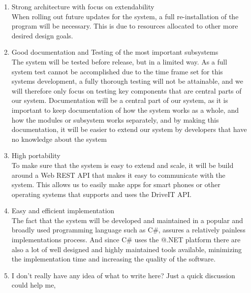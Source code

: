 \begin{enumerate}
\item Strong architecture with focus on extendability\\
When rolling out future updates for the system, a full re-installation of the program will be necessary. This is due to resources allocated to other more desired design goals.\\

\item Good documentation and Testing of the most important subsystems\\
The system will be tested before release, but in a limited way. As a full system test cannot be accomplished due to the time frame set for this systems development, a fully thorough testing will not be attainable, and we will therefore only focus on testing key components that are central parts of our system.
Documentation will be a central part of our system, as it is important to keep documentation of how the system works as a whole, and how the modules or subsystem works separately, and by making this documentation, it will be easier to extend our system by developers that have no knowledge about the system\\

\item High portability \\
To make sure that the system is easy to extend and scale, it will be build around a Web REST API that makes it easy to communicate with the system. This allows us to easily make apps for smart phones or other operating systems that supports and uses the DriveIT API. 

\item Easy and efficient implementation\\
The fact that the system will be developed and maintained in a popular and broadly used programming language such as C\#, assures a relatively painless implementations process. And since C\# uses the @.NET platform there are also a lot of well designed and highly maintained tools available, minimizing the implementation time and increasing the quality of the software.

\item \TODO I don't really have any idea of what to write here? Just a quick discussion could help me,
\end{enumerate} 
